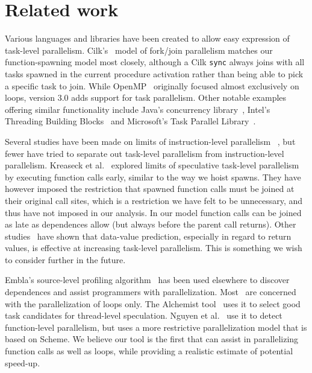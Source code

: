 \section{Related work}

Various languages and libraries have been created to allow easy
expression of task-level parallelism.  Cilk's~\cite{blumofe96cilk}
model of fork/join parallelism matches our function-spawning model
most closely, although a Cilk {\tt sync} always joins with all tasks 
spawned in the current procedure activation rather than being able to 
pick a specific task to join. While OpenMP~\cite{dagum98openmp} 
originally focused almost exclusively on loops, version 3.0 adds 
support for task parallelism.  Other notable examples
offering similar functionality 
include Java's concurrency library~\cite{lea00java}, Intel's
Threading Building Blocks~\cite{reinders07intel} and Microsoft's
Task Parallel Library~\cite{leijen07parallel}.

Several studies have been made on limits of instruction-level parallelism~
\cite{wall91limits,postiff99limits},
but fewer have tried to separate out task-level
parallelism from instruction-level parallelism.  Kreaseck et al.\
 explored limits of speculative task-level
parallelism by executing function calls early, similar to the
way we hoist spawns.  They have however imposed the restriction that
spawned function calls must be joined at their original call sites,
which is a restriction we have felt to be unnecessary, and thus have
not imposed in our analysis.  In our model function calls can be
joined as late as dependences allow (but always before the parent
call returns).  Other studies~\cite{warg01limits,oplinger99insearch}
have shown that data-value prediction, especially in regard to return
values, is effective at increasing task-level parallelism.  This is
something we wish to consider further in the future.

Embla's source-level profiling algorithm~\cite{embla:08} has been used 
elsewhere to discover dependences and assist programmers with parallelization.
Most~\cite{wu08compiler,tournavitis09towards,larus93loop}
are concerned with the parallelization of loops only.
The Alchemist tool~\cite{zhang09alchemist} uses it
to select good task candidates for thread-level speculation.
Nguyen et al.~\cite{nguyen02parallelizing} use it to detect function-level parallelism,
but uses a more restrictive parallelization model that is based on Scheme.
We believe our tool is the first that can assist in parallelizing function calls as well as loops,
while providing a realistic estimate of potential speed-up.

